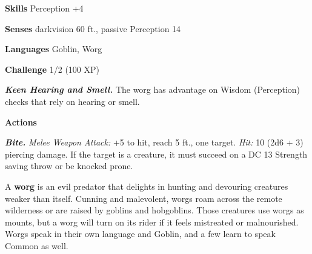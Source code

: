 \documentclass[
]{article}
\begin{document}
\textbf{Skills} Perception +4

\textbf{Senses} darkvision 60 ft., passive Perception 14

\textbf{Languages} Goblin, Worg

\textbf{Challenge} 1/2 (100 XP)

\emph{\textbf{Keen Hearing and Smell.}} The worg has advantage on Wisdom
(Perception) checks that rely on hearing or smell.

\textbf{Actions}

\emph{\textbf{Bite.}} \emph{Melee Weapon Attack:} +5 to hit, reach 5
ft., one target. \emph{Hit:} 10 (2d6 + 3) piercing damage. If the target
is a creature, it must succeed on a DC 13 Strength saving throw or be
knocked prone.

A \textbf{worg} is an evil predator that delights in hunting and
devouring creatures weaker than itself. Cunning and malevolent, worgs
roam across the remote wilderness or are raised by goblins and
hobgoblins. Those creatures use worgs as mounts, but a worg will turn on
its rider if it feels mistreated or malnourished. Worgs speak in their
own language and Goblin, and a few learn to speak Common as well.
\end{document}
